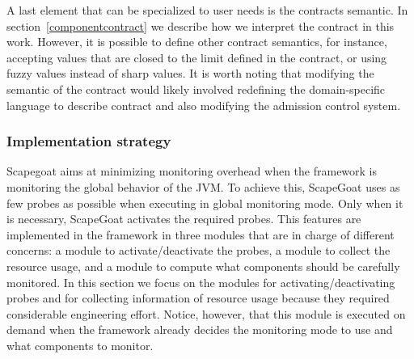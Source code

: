 A last element that can be specialized to user needs is the contracts semantic.
In section~\ref{componentcontract} we describe how we interpret the contract in this work.
However, it is possible to define other contract semantics, for instance, accepting values that are closed to the limit defined in the contract, or using fuzzy values instead of sharp values.
It is worth noting that modifying the semantic of the contract would likely involved redefining the domain-specific language to describe contract and also modifying the admission control system.
 


\subsubsection{Implementation strategy}
Scapegoat aims at minimizing monitoring overhead when the framework is monitoring the global behavior of the JVM. 
To achieve this, ScapeGoat uses as few probes as possible when executing in global monitoring mode.
Only when it is necessary, ScapeGoat activates the required probes.
This features are implemented in the framework in three modules that are in charge of different concerns: a module to activate/deactivate the probes, a module to collect the resource usage, and a module to compute what components should be carefully monitored.
In this section we focus on the modules for activating/deactivating probes and for collecting information of resource usage because they required considerable engineering effort.
Notice, however, that this module is executed on demand when the framework already decides the monitoring mode to use and what components to monitor.

